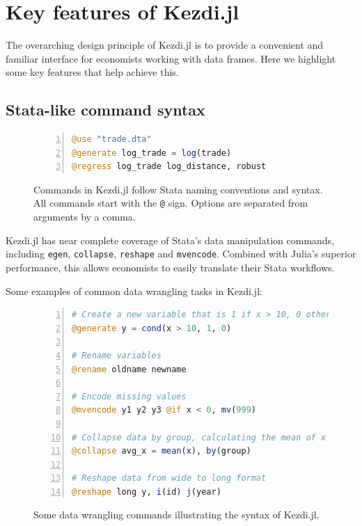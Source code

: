 \documentclass{juliacon}
\begin{document}
\section{Key features of Kezdi.jl}

The overarching design principle of Kezdi.jl is to provide a convenient and familiar interface for economists working with data frames. Here we highlight some key features that help achieve this.

\subsection{Stata-like command syntax}

\begin{figure}[t]
\begin{lstlisting}[language = Julia, numbers=left, numberstyle=\tiny\color{gray}]
@use "trade.dta"
@generate log_trade = log(trade)
@regress log_trade log_distance, robust
\end{lstlisting}
\caption{Commands in Kezdi.jl follow Stata naming conventions and syntax. All commands start with the \texttt{@} sign. Options are separated from arguments by a comma.}
\label{fig:syntax}
\end{figure}

Kezdi.jl has near complete coverage of Stata's data manipulation commands, including \texttt{egen}, \texttt{collapse}, \texttt{reshape} and \texttt{mvencode}. Combined with Julia's superior performance, this allows economists to easily translate their Stata workflows.

Some examples of common data wrangling tasks in Kezdi.jl:

\begin{figure}[t]
\begin{lstlisting}[language = Julia, numbers=left, numberstyle=\tiny\color{gray}]
# Create a new variable that is 1 if x > 10, 0 otherwise
@generate y = cond(x > 10, 1, 0)

# Rename variables
@rename oldname newname

# Encode missing values
@mvencode y1 y2 y3 @if x < 0, mv(999)

# Collapse data by group, calculating the mean of x
@collapse avg_x = mean(x), by(group)

# Reshape data from wide to long format
@reshape long y, i(id) j(year)
\end{lstlisting}
\caption{Some data wrangling commands illustrating the syntax of Kezdi.jl.}
\label{fig:wrangling}
\end{figure}
\end{document}
